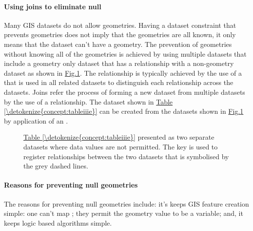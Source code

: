 \documentclass[letterpaper,11pt,english]{sphinxmanual}
\begin{document}
\paragraph{Using joins to eliminate null}
\label{\detokenize{concept:using-joins-to-eliminate-null}}
Many GIS datasets do not allow  geometries.  Having a dataset constraint that prevents  geometries does not imply that the geometries are all known, it only means that the dataset can’t have a  geometry.  The prevention of  geometries without knowing all of the geometries is achieved by using multiple datasets that include a geometry only dataset that has a relationship with a non-geometry dataset as shown in \hyperref[\detokenize{concept:figurejoinedcrosses}]{Fig.\@ \ref{\detokenize{concept:figurejoinedcrosses}}}.  The relationship is typically achieved by the use of a  that is used in all related datasets to distinguish each relationship across the datasets.  Joins refer the process of forming a new dataset from multiple datasets by the use of a relationship.  The dataset shown in \hyperref[\detokenize{concept:tableiiie}]{Table \ref{\detokenize{concept:tableiiie}}} can be created from the datasets shown in \hyperref[\detokenize{concept:figurejoinedcrosses}]{Fig.\@ \ref{\detokenize{concept:figurejoinedcrosses}}} by application of an .

\begin{figure}[htbp]
\centering
\capstart

\noindent{}
\caption{\hyperref[\detokenize{concept:tableiiie}]{Table \ref{\detokenize{concept:tableiiie}}} presented as two separate datasets where   data values are not permitted.  The  key is used to register relationships between the two datasets that is symbolised by the grey dashed lines.}\label{\detokenize{concept:id55}}\label{\detokenize{concept:figurejoinedcrosses}}\end{figure}


\paragraph{Reasons for preventing null geometries}
\label{\detokenize{concept:reasons-for-preventing-null-geometries}}
The reasons for preventing null geometries include: it’s keeps GIS feature creation simple: one can’t map ; they permit the geometry value to be a variable; and, it keeps logic based algorithms simple.
\end{document}
